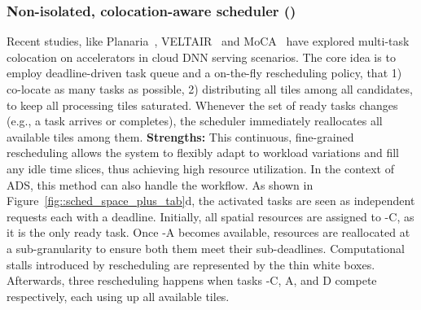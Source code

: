 \subsubsection{Non-isolated, colocation-aware scheduler (\TpFirstName)}%
\label{sec::non-isolated_spatial-aware_scheduler}
Recent studies, like Planaria~\cite{Ghodrati2020-Planaria}, VELTAIR~\cite{Liu2022-VELTAIR} and MoCA~\cite{Kim2023MoCA} have explored multi-task colocation on \hwname accelerators in cloud DNN serving scenarios. 
The core idea is to employ deadline-driven task queue and a on-the-fly rescheduling policy, that 1) co-locate as many tasks as possible, 2) distributing all tiles among all candidates, to keep all processing tiles saturated. Whenever the set of ready tasks changes (e.g., a task arrives or completes), the scheduler immediately reallocates all available tiles among them. \textbf{Strengths:} This continuous, fine-grained rescheduling allows the system to flexibly adapt to workload variations and fill any idle time slices, thus achieving high resource utilization. 
%
In the context of ADS, this method can also handle the \ETEs workflow. As shown in Figure~\ref{fig::sched_space_plus_tab}d, the activated tasks are seen as independent requests each with a deadline. Initially, all spatial resources are assigned to \singlefunc-C, as it is the only ready task. Once \singlefunc-A becomes available, resources are reallocated at a sub-\singlefunc granularity to ensure both them meet their sub-deadlines. Computational stalls introduced by rescheduling are represented by the thin white boxes. 
Afterwards, three rescheduling happens when tasks \singlefunc-C, A, and D compete respectively, each using up all available tiles. 

